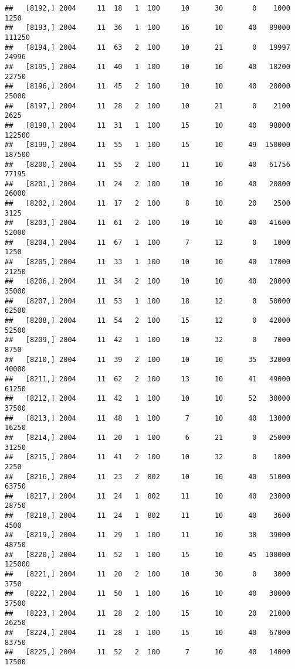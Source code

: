\documentclass{article}\usepackage[]{graphicx}\usepackage[]{color}
\makeatletter
\newenvironment{kframe}{%
 \def\at@end@of@kframe{}%
 \ifinner\ifhmode%
  \def\at@end@of@kframe{\end{minipage}}%
  \begin{minipage}{\columnwidth}%
 \fi\fi%
 \def\FrameCommand##1{\hskip\@totalleftmargin \hskip-\fboxsep
 \colorbox{shadecolor}{##1}\hskip-\fboxsep
     \hskip-\linewidth \hskip-\@totalleftmargin \hskip\columnwidth}%
 \MakeFramed {\advance\hsize-\width
   \@totalleftmargin\z@ \linewidth\hsize
   \@setminipage}}%
 {\par\unskip\endMakeFramed%
 \at@end@of@kframe}
\newenvironment{knitrout}{}{} %
\makeatother
\begin{document}
\begin{knitrout}
\begin{kframe}
\begin{verbatim}
##   [8192,] 2004     11  18   1  100     10      30       0    1000    1250
##   [8193,] 2004     11  36   1  100     16      10      40   89000  111250
##   [8194,] 2004     11  63   2  100     10      21       0   19997   24996
##   [8195,] 2004     11  40   1  100     10      10      40   18200   22750
##   [8196,] 2004     11  45   2  100     10      10      40   20000   25000
##   [8197,] 2004     11  28   2  100     10      21       0    2100    2625
##   [8198,] 2004     11  31   1  100     15      10      40   98000  122500
##   [8199,] 2004     11  55   1  100     15      10      49  150000  187500
##   [8200,] 2004     11  55   2  100     11      10      40   61756   77195
##   [8201,] 2004     11  24   2  100     10      10      40   20800   26000
##   [8202,] 2004     11  17   2  100      8      10      20    2500    3125
##   [8203,] 2004     11  61   2  100     10      10      40   41600   52000
##   [8204,] 2004     11  67   1  100      7      12       0    1000    1250
##   [8205,] 2004     11  33   1  100     10      10      40   17000   21250
##   [8206,] 2004     11  34   2  100     10      10      40   28000   35000
##   [8207,] 2004     11  53   1  100     18      12       0   50000   62500
##   [8208,] 2004     11  54   2  100     15      12       0   42000   52500
##   [8209,] 2004     11  42   1  100     10      32       0    7000    8750
##   [8210,] 2004     11  39   2  100     10      10      35   32000   40000
##   [8211,] 2004     11  62   2  100     13      10      41   49000   61250
##   [8212,] 2004     11  42   1  100     10      10      52   30000   37500
##   [8213,] 2004     11  48   1  100      7      10      40   13000   16250
##   [8214,] 2004     11  20   1  100      6      21       0   25000   31250
##   [8215,] 2004     11  41   2  100     10      32       0    1800    2250
##   [8216,] 2004     11  23   2  802     10      10      40   51000   63750
##   [8217,] 2004     11  24   1  802     11      10      40   23000   28750
##   [8218,] 2004     11  24   1  802     11      10      40    3600    4500
##   [8219,] 2004     11  29   1  100     11      10      38   39000   48750
##   [8220,] 2004     11  52   1  100     15      10      45  100000  125000
##   [8221,] 2004     11  20   2  100     10      30       0    3000    3750
##   [8222,] 2004     11  50   1  100     16      10      40   30000   37500
##   [8223,] 2004     11  28   2  100     15      10      20   21000   26250
##   [8224,] 2004     11  28   1  100     15      10      40   67000   83750
##   [8225,] 2004     11  52   2  100      7      10      40   14000   17500

\end{verbatim}
\end{kframe}
\end{knitrout}
\end{document}
